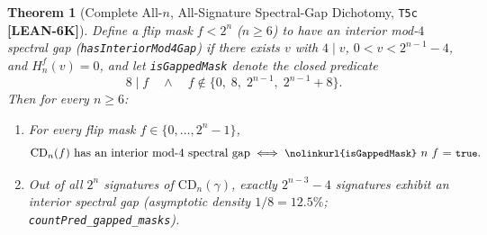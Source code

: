 \documentclass[11pt,reqno]{amsart}
\newcommand{\code}[1]{\textnormal{\texttt{\small\nolinkurl{#1}}}}
\newcommand{\cmd}[1]{\textnormal{\texttt{\small #1}}}
\theoremstyle{plain}
\newtheorem{theorem}{Theorem}[section]
\theoremstyle{definition}
\theoremstyle{remark}
\newcommand{\tagLean}{\mbox{\textsf{\textbf{\color{oiBlue}[LEAN-6K]}}}}
\newcommand{\CD}{\mathrm{CD}}
\begin{document}
\begin{theorem}[Complete All-$n$, All-Signature Spectral-Gap Dichotomy, \texttt{T5c} \tagLean]
\label{thm:t5c}
Define a flip mask $f < 2^n$ ($n \ge 6$) to have an \emph{interior mod-$4$ spectral gap}
(\code{hasInteriorMod4Gap}) if there exists $v$ with $4 \mid v$, $0 < v < 2^{n-1} - 4$, and
$H_n^f(v) = 0$, and let \code{isGappedMask} denote the closed predicate
\[
  8 \mid f \quad \land \quad f \notin \bigl\{0,\; 8,\; 2^{n-1},\; 2^{n-1} + 8\bigr\}.
\]
Then for every $n \ge 6$:
\begin{enumerate}[leftmargin=2em]
  \item For every flip mask $f \in \{0, \dots, 2^n - 1\}$,
    \begin{equation}
      \text{$\CD_n(f)$ has an interior mod-$4$ spectral gap} \iff \text{\code{isGappedMask} $n$ $f$ = \cmd{true}}.
    \end{equation}
  \item Out of all $2^n$ signatures of $\CD_n(\gamma)$, \emph{exactly} $2^{n-3} - 4$ signatures
    exhibit an interior spectral gap (asymptotic density $1/8 = 12.5\%$; \code{countPred_gapped_masks}).
\end{enumerate}
\end{theorem}
\end{document}
